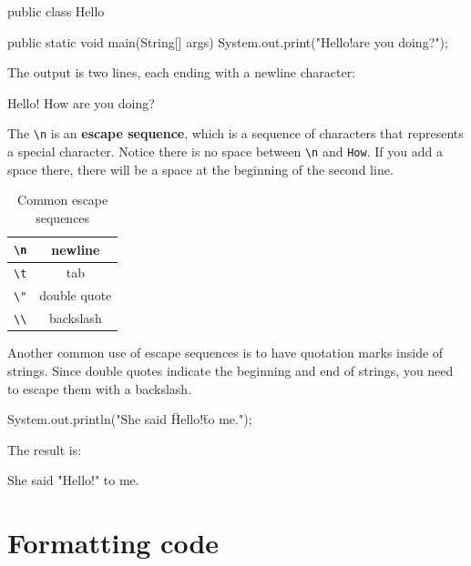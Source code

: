 \documentclass[12pt]{book}
\theoremstyle{exercise}
\begin{document}
\begin{code}
public class Hello {

    public static void main(String[] args) {
        System.out.print("Hello!\nHow are you doing?\n");
    }
}
\end{code}

The output is two lines, each ending with a newline character:

\begin{stdout}
Hello!
How are you doing?
\end{stdout}


The \verb"\n" is an {\bf escape sequence}, which is a sequence of characters that represents a special character.
Notice there is no space between \verb"\n" and \verb"How".
If you add a space there, there will be a space at the beginning of the second line.

\begin{table}[!ht]
\begin{center}
\begin{tabular}{|c|c|}
\hline
\verb"\n" & newline \\
\hline
\verb"\t" & tab \\
\hline
\verb'\"' & double quote \\
\hline
\verb"\\" & backslash \\
\hline
\end{tabular}
\caption{Common escape sequences}
\end{center}
\end{table}


Another common use of escape sequences is to have quotation marks inside of strings.
Since double quotes indicate the beginning and end of strings, you need to escape them with a backslash.

\begin{code}
System.out.println("She said \"Hello!\" to me.");
\end{code}

The result is:

\begin{stdout}
She said "Hello!" to me.
\end{stdout}


\section{Formatting code}
\label{formatting}
\end{document}
